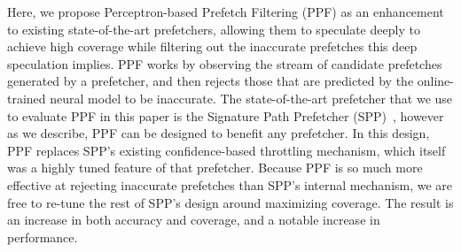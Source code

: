 

Here, we propose Perceptron-based Prefetch Filtering (PPF) as an
enhancement to existing state-of-the-art prefetchers, allowing them to
speculate deeply to achieve high coverage while filtering out the
inaccurate prefetches this deep speculation implies.  PPF works by
observing the stream of candidate prefetches generated by a
prefetcher, and then rejects those that are predicted by the
online-trained neural model to be inaccurate.  The state-of-the-art
prefetcher that we use to evaluate PPF in this paper is the Signature
Path Prefetcher (SPP)~\cite{SPP}, however as we describe, PPF can be
designed to benefit any prefetcher.  In this design, PPF replaces
SPP's existing confidence-based throttling mechanism, which itself was
a highly tuned feature of that prefetcher.  Because PPF is so much
more effective at rejecting inaccurate prefetches than SPP's 
{internal} mechanism, we are free to re-tune the rest of 
SPP's design around maximizing coverage. The result is an increase 
in both accuracy and coverage, and a notable increase in performance.

